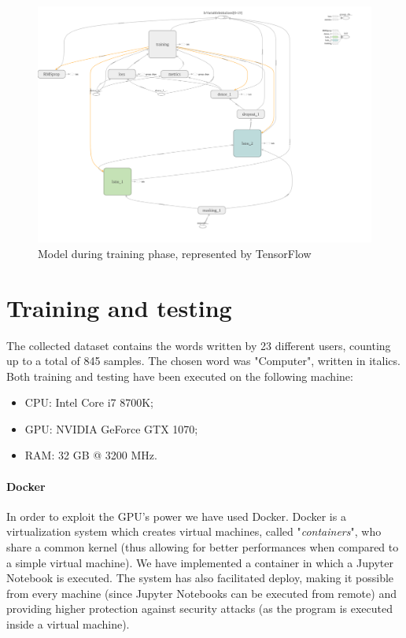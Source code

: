 \documentclass[8pt,notitlepage]{report}
\begin{document}
			\begin{figure}
				\begin{center}
					\includegraphics[scale=.23]{lstm_model}
					\caption{Model during training phase, represented by TensorFlow}
				\end{center}
			\end{figure}		
		


\chapter{Training and testing}
	The collected dataset contains the words written by 23 different users, counting up to a total of 845 samples. The chosen word was "Computer", written in italics. \\
	Both training and testing have been executed on the following machine:
	\begin{itemize}
		\item CPU: Intel Core i7 8700K;
		\item GPU: NVIDIA GeForce GTX 1070;
		\item RAM: 32 GB @ 3200 MHz.
	\end{itemize}
	
	\subsubsection*{Docker}
		In order to exploit the GPU's power we have used Docker. Docker is a virtualization system which creates virtual machines, called "\textit{containers}", who share a common kernel (thus allowing for better performances when compared to a simple virtual machine). We have implemented a container in which a Jupyter Notebook is executed. The system has also facilitated deploy, making it possible from every machine (since Jupyter Notebooks can be executed from remote) and providing higher protection against security attacks (as the program is executed inside a virtual machine). 
	
\end{document}
